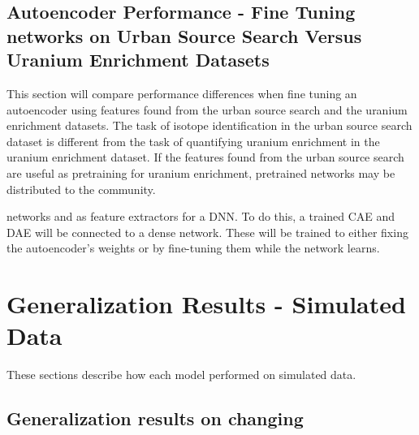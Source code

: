 \subsection{Autoencoder Performance - Fine Tuning networks on Urban Source Search Versus Uranium Enrichment Datasets}

This section will compare performance differences when fine tuning an autoencoder using features found from the urban source search and the uranium enrichment datasets. The task of isotope identification in the urban source search dataset is different from the task of quantifying uranium enrichment in the uranium enrichment dataset. If the features found from the urban source search are useful as pretraining for uranium enrichment, pretrained networks may be distributed to the community.


networks and as feature extractors for a DNN. To do this, a trained CAE and DAE will be connected to a dense network. These will be trained to either fixing the autoencoder's weights or by fine-tuning them while the network learns.


\section{Generalization Results - Simulated Data}

These sections describe how each model performed on simulated data.

\subsection{Generalization results on changing }


